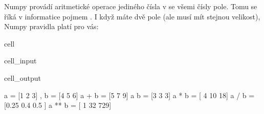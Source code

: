 \documentclass[letterpaper,10pt,english]{jupyterBook}
\begin{document}
\sphinxAtStartPar
Numpy provádí aritmetické operace jediného čísla v  se všemi čísly pole. Tomu se říká v informatice pojmem .
I když máte dvě pole (ale musí mít stejnou velikost), Numpy pravidla platí pro vás:

\begin{sphinxuseclass}{cell}\begin{sphinxVerbatimInput}

\begin{sphinxuseclass}{cell_input}
\begin{sphinxVerbatim}[commandchars=\\\{\}]
  \PYG{p}{[}  \PYG{p}{]}
  \PYG{p}{[}  \PYG{p}{]}
   
   
   
   
   
   
\end{sphinxVerbatim}

\end{sphinxuseclass}\end{sphinxVerbatimInput}
\begin{sphinxVerbatimOutput}

\begin{sphinxuseclass}{cell_output}
\begin{sphinxVerbatim}[commandchars=\\\{\}]
a = [1 2 3] , b = [4 5 6]
a + b = [5 7 9]
a \PYGZhy{} b = [\PYGZhy{}3 \PYGZhy{}3 \PYGZhy{}3]
a * b = [ 4 10 18]
a / b = [0.25 0.4  0.5 ]
a ** b = [  1  32 729]
\end{sphinxVerbatim}

\end{sphinxuseclass}\end{sphinxVerbatimOutput}

\end{sphinxuseclass}
\end{document}
